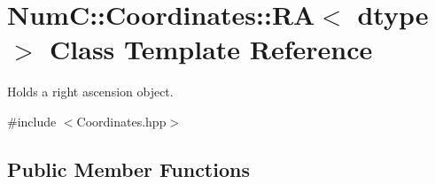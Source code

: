 \hypertarget{class_num_c_1_1_coordinates_1_1_r_a}{}\section{NumC\+:\+:Coordinates\+:\+:RA$<$ dtype $>$ Class Template Reference}
\label{class_num_c_1_1_coordinates_1_1_r_a}


Holds a right ascension object.  




{\ttfamily \#include $<$Coordinates.\+hpp$>$}

\subsection*{Public Member Functions}
